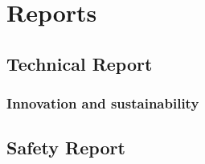     \section{Reports}

    \subsection{Technical Report}

      \subsubsection{Innovation and sustainability}

    \subsection{Safety Report}
    
    

  




